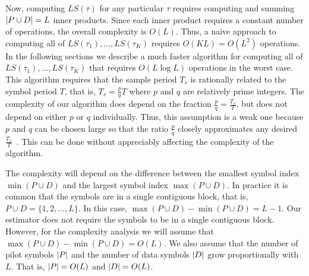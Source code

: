 \documentclass[journal]{IEEEtranTCOM}
\begin{document}
Now, computing $LS(\tau)$ for any particular $\tau$ requires computing and summing ${\vert  P \cup D \vert} = L$ inner products.  Since each inner product requires a constant number of operations, the overall complexity is $O(L)$.  Thus, a naive approach to computing all of $LS(\tau_1), \dots, LS(\tau_K)$ requires $O(KL) = O(L^2)$ operations.
In the following sections we describe a much faster algorithm for computing all of $LS(\tau_1), \dots, LS(\tau_K)$ that requires $O(L\log L)$ operations in the worst case.  This algorithm requires that the sample period $T_s$ is rationally related to the symbol period $T$, that is, $T_s = \tfrac{p}{q}T$ where $p$ and $q$ are relatively prime integers.  %
The complexity of our algorithm does depend on the fraction $\tfrac{p}{q} = \tfrac{T_s}{T}$, but does not depend on either $p$ or $q$ individually.  Thus, this assumption is a weak one because $p$ and $q$ can be chosen large so that the ratio $\tfrac{p}{q}$ closely approximates any desired $\tfrac{T_s}{T}$~\cite{Mordell_Diophantine_equations_1969}.  This can be done without appreciably affecting the complexity of the algorithm.  

The complexity will depend on the difference between the smallest symbol index $\min(P \cup D)$ and the largest symbol index $\max(P\cup D)$.  In practice it is common that the symbols are in a single contiguous block, that is, $P \cup D = \{1,2,\dots,L\}$.  In this case, $\max(P\cup D) - \min(P\cup D) = L-1$.  Our estimator does not require the symbols to be in a single contiguous block.  However, for the complexity analysis we will assume that $\max(P\cup D) - \min(P\cup D) = O(L)$.  We also assume that the number of pilot symbols ${\left\vert P \right\vert}$ and the number of data symbols ${\left\vert D \right\vert}$ grow proportionally with $L$.  That is, ${\left\vert P \right\vert} = O(L)$ and ${\left\vert D \right\vert} = O(L)$.

\end{document}
